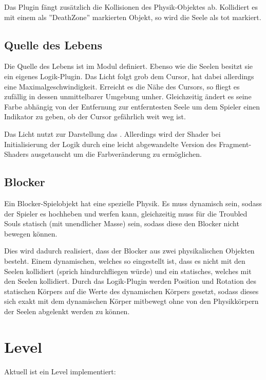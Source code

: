 Das Plugin fängt zusätzlich die Kollisionen des Physik-Objektes ab. Kollidiert es mit einem als ''DeathZone'' markierten Objekt, so wird die Seele als tot markiert.

\subsection{Quelle des Lebens}

Die Quelle des Lebens ist im Modul  definiert. Ebenso wie die Seelen besitzt sie ein eigenes Logik-Plugin. Das Licht folgt grob dem Cursor, hat dabei allerdings eine Maximalgeschwindigkeit. Erreicht es die Nähe des Cursors, so fliegt es zufällig in dessen unmittelbarer Umgebung umher. Gleichzeitig ändert es seine Farbe abhängig von der Entfernung zur entferntesten Seele um dem Spieler einen Indikator zu geben, ob der Cursor gefährlich weit weg ist.

Das Licht nutzt zur Darstellung das . Allerdings wird der Shader bei Initialisierung der Logik durch eine leicht abgewandelte Version des Fragment-Shaders ausgetauscht um die Farbveränderung zu ermöglichen.

\subsection{Blocker}

Ein Blocker-Spielobjekt hat eine spezielle Physik. Es muss dynamisch sein, sodass der Spieler es hochheben und werfen kann, gleichzeitig muss für die Troubled Souls statisch (mit unendlicher Masse) sein, sodass diese den Blocker nicht bewegen können.

Dies wird dadurch realisiert, dass der Blocker aus zwei physikalischen Objekten besteht. Einem dynamischen, welches so eingestellt ist, dass es nicht mit den Seelen kollidiert (sprich hindurchfliegen würde) und ein statisches, welches mit den Seelen kollidiert. Durch das Logik-Plugin werden Position und Rotation des statischen Körpers auf die Werte des dynamischen Körpers gesetzt, sodass dieses sich exakt mit dem dynamischen Körper mitbewegt ohne von den Physikkörpern der Seelen abgelenkt werden zu können.

\section{Level}

Aktuell ist ein Level implementiert:

